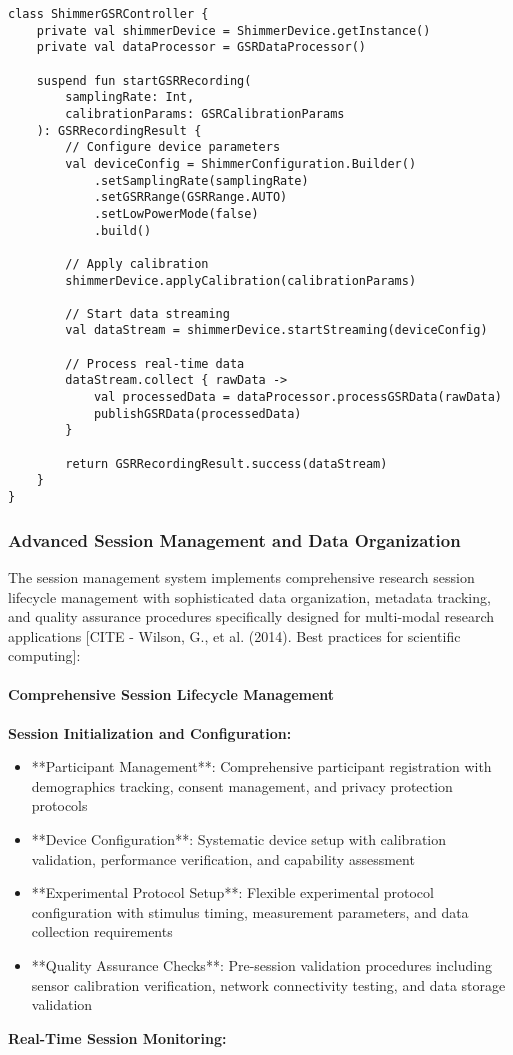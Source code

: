 \documentclass[12pt,a4paper]{article}
\begin{document}
\begin{verbatim}
class ShimmerGSRController {
    private val shimmerDevice = ShimmerDevice.getInstance()
    private val dataProcessor = GSRDataProcessor()

    suspend fun startGSRRecording(
        samplingRate: Int,
        calibrationParams: GSRCalibrationParams
    ): GSRRecordingResult {
        // Configure device parameters
        val deviceConfig = ShimmerConfiguration.Builder()
            .setSamplingRate(samplingRate)
            .setGSRRange(GSRRange.AUTO)
            .setLowPowerMode(false)
            .build()

        // Apply calibration
        shimmerDevice.applyCalibration(calibrationParams)

        // Start data streaming
        val dataStream = shimmerDevice.startStreaming(deviceConfig)

        // Process real-time data
        dataStream.collect { rawData ->
            val processedData = dataProcessor.processGSRData(rawData)
            publishGSRData(processedData)
        }

        return GSRRecordingResult.success(dataStream)
    }
}
\end{verbatim}

\subsubsection{Advanced Session Management and Data Organization}

The session management system implements comprehensive research session lifecycle management with sophisticated data
organization, metadata tracking, and quality assurance procedures specifically designed for multi-modal research
applications [CITE - Wilson, G., et al. (2014). Best practices for scientific computing]:

\paragraph{Comprehensive Session Lifecycle Management}

\textbf{Session Initialization and Configuration:}

\begin{itemize}
\item **Participant Management**: Comprehensive participant registration with demographics tracking, consent management, and
  privacy protection protocols
\item **Device Configuration**: Systematic device setup with calibration validation, performance verification, and
  capability assessment
\item **Experimental Protocol Setup**: Flexible experimental protocol configuration with stimulus timing, measurement
  parameters, and data collection requirements
\item **Quality Assurance Checks**: Pre-session validation procedures including sensor calibration verification, network
  connectivity testing, and data storage validation

\end{itemize}
\textbf{Real-Time Session Monitoring:}
\end{document}
